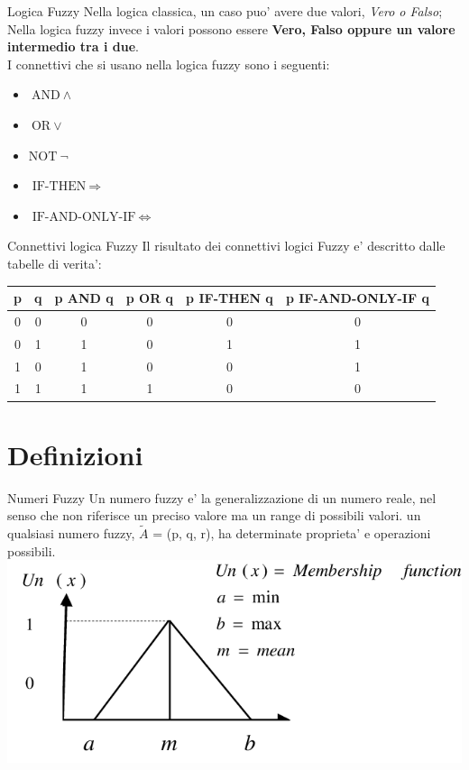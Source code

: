 \documentclass[9pt,aspectratio=169]{beamer}
\begin{document}
\begin{frame}{Logica Fuzzy}
Nella logica classica, un caso puo' avere due valori, \textit{Vero o Falso};\\ Nella logica fuzzy invece i valori possono essere \textbf{Vero, Falso oppure un valore intermedio tra i due}.\\
I connettivi che si usano nella logica fuzzy sono i seguenti:
\begin{itemize}
    \item $\text{AND}  \ \wedge$
    \item $\text{OR} \ \vee$
    \item $\text{NOT} \ \neg$
    \item $\text{IF-THEN} \ \Rightarrow$
    \item $\text{IF-AND-ONLY-IF} \ \Leftrightarrow$
\end{itemize}
\end{frame}

\begin{frame}{Connettivi logica Fuzzy}
Il risultato dei connettivi logici Fuzzy e' descritto dalle tabelle di verita':\\

\begin{longtable}{cc|c|c|c|c}
p & q & p AND q & p OR q & p IF-THEN q & p IF-AND-ONLY-IF q \\ \hline
\endfirsthead
%
\endhead
%
0 & 0 & 0       & 0      & 0           & 0                  \\
0 & 1 & 1       & 0      & 1           & 1                  \\
1 & 0 & 1       & 0      & 0           & 1                  \\
1 & 1 & 1       & 1      & 0           & 0                 
\end{longtable}
\end{frame}

\section{Definizioni}
\begin{frame}{Numeri Fuzzy} Un numero fuzzy e' la generalizzazione di un numero reale, nel senso che non riferisce un preciso valore ma un range di possibili valori. un qualsiasi numero fuzzy, $\tilde{A}$ = (p, q, r), ha determinate proprieta' e operazioni possibili.\\
\includegraphics[scale=0.5]{images/Triangular-fuzzy-number-diagram.png}


\end{frame}
\end{document}
